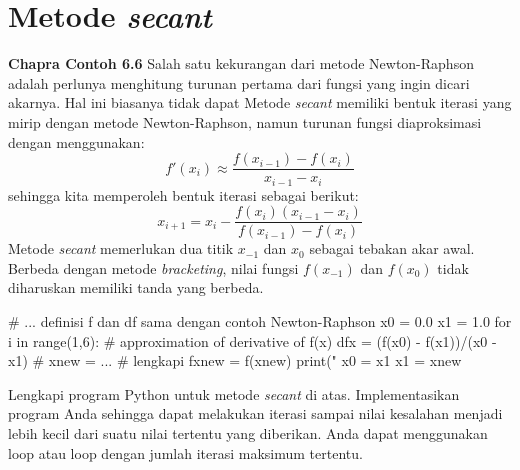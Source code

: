 \section{Metode \textit{secant}}

\textbf{Chapra Contoh 6.6}
Salah satu kekurangan dari metode Newton-Raphson
adalah perlunya menghitung turunan
pertama dari fungsi yang ingin dicari akarnya. Hal ini biasanya tidak dapat 
Metode \textit{secant} memiliki bentuk iterasi yang mirip dengan metode
Newton-Raphson, namun turunan fungsi diaproksimasi dengan menggunakan:
\begin{equation*}
f'(x_{i}) \approx \frac{f(x_{i-1}) - f(x_{i})}{x_{i-1} - x_{i}}
\end{equation*}
sehingga kita memperoleh bentuk iterasi sebagai berikut:
\begin{equation}
x_{i+1} = x_{i} - \frac{f(x_{i}) (x_{i-1} - x_{i})}{f(x_{i-1}) - f(x_{i})}
\end{equation}
Metode \textit{secant} memerlukan dua titik $x_{-1}$ dan $x_{0}$
sebagai tebakan akar awal. Berbeda
dengan metode \textit{bracketing}, nilai fungsi $f(x_{-1})$ dan $f(x_{0})$
tidak diharuskan memiliki tanda yang berbeda.

\begin{pythoncode}
# ... definisi f dan df sama dengan contoh Newton-Raphson
x0 = 0.0
x1 = 1.0
for i in range(1,6):
    # approximation of derivative of f(x)
    dfx = (f(x0) - f(x1))/(x0 - x1)
    #
    xnew = ... # lengkapi
    fxnew = f(xnew)
    print("%
    x0 = x1
    x1 = xnew    
\end{pythoncode}

\begin{soal}
Lengkapi program Python untuk metode \textit{secant} di atas.
Implementasikan program Anda sehingga
dapat melakukan iterasi sampai nilai kesalahan menjadi lebih kecil dari
suatu nilai tertentu yang diberikan. Anda dapat menggunakan loop 
atau loop  dengan jumlah iterasi maksimum tertentu.
\end{soal}